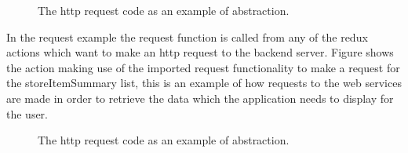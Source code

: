 \documentclass[a4paper,11pt]{report}
\begin{document}
\begin{figure}[H]
\centering
{}
\caption{The http request code as an example of abstraction.}
\label{fig:request}
\end{figure}

In the request example the request function is called from any of the redux actions which want to make an http request to the
backend server. Figure  shows the action making use of the imported request functionality to make a request 
for the storeItemSummary list, this is an example of how requests to the web services are made in order to retrieve the data which the application
needs to display for the user.

\begin{figure}[H]
    \centering
    \caption{The http request code as an example of abstraction.}
    \label{fig:actionExample}
    \end{figure}
\end{document}
